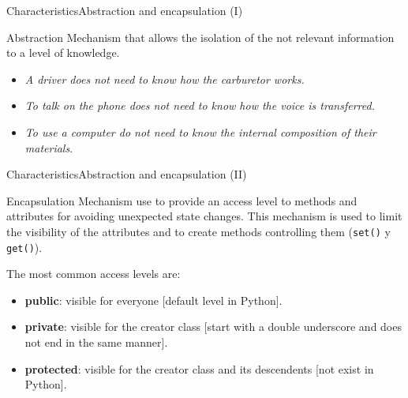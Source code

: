 \documentclass[10pt,compress]{beamer} %
\begin{document}
\begin{frame}{Characteristics}{Abstraction and encapsulation (I)}
	\begin{block}{Abstraction}
		Mechanism that allows the isolation of the not relevant information to a level of knowledge.
  	\end{block}	
	
	\begin{itemize}
		\item \textit{A driver does not need to know how the carburetor works.} 
		\item \textit{To talk on the phone does not need to know how the voice is transferred.} 
		\item \textit{To use a computer do not need to know the internal composition of their materials}. 							  
		
	\end{itemize}
\end{frame}

\begin{frame}{Characteristics}{Abstraction and encapsulation (II)}
	\begin{block}{Encapsulation}
		Mechanism use to provide an access level to methods and attributes for avoiding unexpected state changes. This mechanism is used to limit the visibility of the attributes and to create methods controlling them (\texttt{set()} y \texttt{get()}).
  	\end{block}	
	
The most common access levels are:
	
	\begin{itemize}
		\item \textbf{public}: visible for everyone  [default level in Python].
		\item \textbf{private}: visible for the creator class [start with a double underscore and does not end in the same manner].
		\item \textbf{protected}: visible for the creator class and its descendents \alert{[not exist in Python]}. 
	\end{itemize}
\end{frame}
\end{document}
